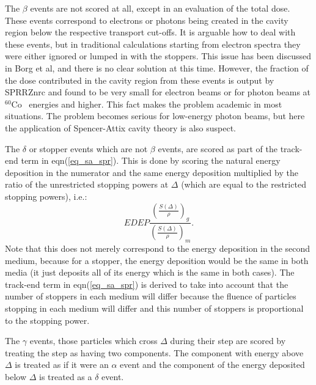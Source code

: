 \documentclass[12pt,twoside]{article}  %
\newcommand{\Co}{$^{60}$Co}
\newcommand{\eqn}[1]{\begin{equation} #1 \end{equation} }
\newcommand{\rspt}[1]{\left( \frac{S(\Delta)}{\rho} \right)_{#1}}
\begin{document}
The $\beta$ events are not scored at all, except in an evaluation of the
total dose. These events correspond to electrons or photons being created
in the cavity region below the respective transport cut-offs. It is
arguable how to deal with these events, but in traditional calculations
starting from electron spectra they were either ignored or lumped in with
the stoppers.  This issue has been discussed in Borg et al, and there is no
clear solution at this time\cite{Bo99a}.  However, the fraction of the dose contributed
in the cavity region from these events is output by SPRRZnrc and found to
be very small for electron beams or for photon beams at \Co~ energies and
higher. This fact makes the problem academic in most situations.  The
problem becomes serious for low-energy photon beams, but here the
application of Spencer-Attix cavity theory is also suspect\cite{Bo99a}.

The $\delta$ or stopper events which are not $\beta$ events,
are scored as part of the track-end term in
eqn(\ref{eq_sa_spr}).  This is done by scoring the natural energy deposition
in the numerator and the same energy deposition multiplied by the ratio of
the unrestricted stopping powers at $\Delta$ (which are equal to the
restricted stopping powers), i.e.:
\eqn{EDEP \frac{\rspt{g}}{\rspt{m}}.}
Note that this does not merely correspond to the energy deposition in the
second medium, because for a stopper, the energy deposition would be the
same in both media (it just deposits all of its energy which is the same in
both cases). The track-end term in eqn(\ref{eq_sa_spr}) is derived to take
into account that the number of stoppers in each medium will differ because
the fluence of particles stopping in each medium will differ and this
number of stoppers is proportional to the stopping power.

The $\gamma$ events, those particles which cross $\Delta$ during their step
are scored by treating the step as having two components.  The component
with energy above $\Delta$ is treated as if it were an $\alpha$ event and
the component of the energy deposited below $\Delta$ is treated as a
$\delta$ event.
\end{document}
